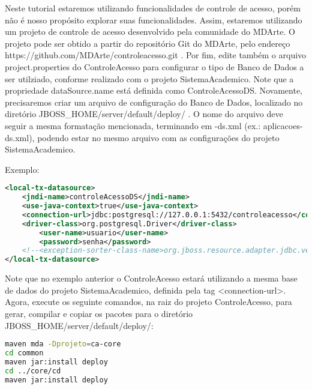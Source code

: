 Neste tutorial estaremos utilizando funcionalidades de controle de acesso, porém não é
nosso propósito explorar suas funcionalidades. Assim, estaremos utilizando um projeto de controle
de acesso desenvolvido pela comunidade do MDArte.
O projeto pode ser obtido a partir do repositório Git do MDArte,
pelo endereço https://github.com/MDArte/controleacesso.git . Por fim, edite também o
arquivo project.properties do ControleAcesso para configurar o tipo de Banco de Dados a ser
utilziado, conforme realizado com o projeto SistemaAcademico. Note que a propriedade
dataSource.name está definida como ControleAcessoDS.
Novamente, precisaremos criar um arquivo de configuração do Banco de Dados, localizado
no diretório JBOSS\_HOME/server/default/deploy/ . O nome do arquivo deve seguir
a mesma formatação mencionada, terminando em -ds.xml (ex.: aplicacoes-ds.xml), podendo estar no mesmo
arquivo com as configurações do projeto SistemaAcademico.

Exemplo:

\begin{lstlisting}[language=xml]
<local-tx-datasource>
	<jndi-name>controleAcessoDS</jndi-name>
	<use-java-context>true</use-java-context>
	<connection-url>jdbc:postgresql://127.0.0.1:5432/controleacesso</connection-url> 
	<driver-class>org.postgresql.Driver</driver-class>
		<user-name>usuario</user-name>
		<password>senha</password>
	<!--<exception-sorter-class-name>org.jboss.resource.adapter.jdbc.vendor.OracleExceptionSorter</exception-sorter-class-name>-->
</local-tx-datasource>
\end{lstlisting}

Note que no exemplo anterior o ControleAcesso estará utilizando a mesma base de dados
do projeto SistemaAcademico, definida pela tag <connection-url>. Agora, execute os seguinte
comandos, na raiz do projeto ControleAcesso, para gerar, compilar e copiar os pacotes para o
diretório JBOSS\_HOME/server/default/deploy/:

\begin{lstlisting}[language=bash]
maven mda -Dprojeto=ca-core
cd common
maven jar:install deploy
cd ../core/cd
maven jar:install deploy
\end{lstlisting}